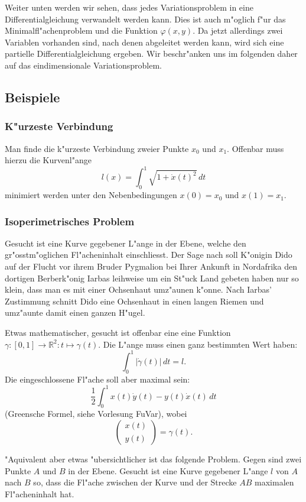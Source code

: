 Weiter unten werden wir sehen, dass jedes Variationsproblem in eine
Differentialgleichung verwandelt werden kann.
Dies ist auch m"oglich f"ur das Minimalfl"achenproblem und die 
Funktion $\varphi(x,y)$.
Da jetzt allerdings
zwei Variablen vorhanden sind, nach denen abgeleitet werden kann, wird
sich eine partielle Differentialgleichung ergeben.
Wir beschr"anken uns im folgenden daher auf das eindimensionale
Variationsproblem.

\subsection{Beispiele}
\subsubsection{K"urzeste Verbindung}
Man finde die k"urzeste Verbindung zweier Punkte $x_0$ und $x_1$.
Offenbar muss hierzu die Kurvenl"ange
\begin{equation}
l(x)=\int_0^1 \sqrt{1+\dot x(t)^2}\,dt
\label{kuerzeste-verbindung-variationsprinzip}
\end{equation}
minimiert werden unter den Nebenbedingungen $x(0)=x_0$ und
$x(1)=x_1$.

\subsubsection{Isoperimetrisches Problem}
Gesucht ist eine Kurve gegebener L"ange in der Ebene, welche den
gr"osstm"oglichen Fl"acheninhalt einschliesst.
Der Sage nach soll K"onigin Dido auf der Flucht vor ihrem Bruder
Pygmalion bei Ihrer Ankunft in Nordafrika den dortigen Berberk"onig
Iarbas leihweise um ein St"uck Land gebeten haben nur so klein, dass man es mit
einer Ochsenhaut umz"aunen k"onne. Nach Iarbas' Zustimmung schnitt
Dido eine Ochsenhaut in einen langen Riemen und umz"aunte damit einen ganzen
H"ugel.

Etwas mathematischer, gesucht ist offenbar eine eine Funktion
$\gamma\colon [0,1]\to\mathbb R^2:t\mapsto \gamma(t)$. Die
L"ange muss einen ganz bestimmten Wert haben:
\[
\int_0^1 |\dot\gamma(t)|\,dt = l.
\]
Die eingeschlossene Fl"ache soll aber maximal sein:
\[
\frac12\int_0^1 x(t)\dot y(t)-y(t)\dot x(t)\,dt
\]
(Greensche Formel, siehe Vorlesung FuVar), wobei
\[
\begin{pmatrix}x(t)\\y(t)\end{pmatrix}=\gamma(t).
\]

"Aquivalent aber etwas "ubersichtlicher ist das folgende Problem.
Gegen sind zwei Punkte $A$ und $B$ in der Ebene. Gesucht ist eine
Kurve gegebener L"ange $l$ von $A$ nach $B$ so, dass die Fl"ache
zwischen der Kurve und der Strecke $AB$ maximalen Fl"acheninhalt hat.

